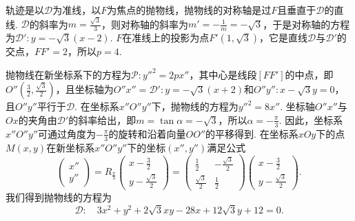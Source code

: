 \begin{solution}
  \begin{inparaenum}[(a)]
    \item 轨迹是以$\mathscr D$为准线，以$F$为焦点的抛物线，抛物线的对称轴是过$F$且垂直于$\mathscr D$的直线. $\mathscr D$的斜率为$m=\frac{\sqrt3}3$，则对称轴的斜率为$m'=-\frac1m=-\sqrt3$，于是对称轴的方程为$\mathscr D':y=-\sqrt3(x-2)$. $F$在准线上的投影为点$F'(1,\sqrt3)$，它是直线$\mathscr D$与$\mathscr D'$的交点，$FF'=2$，所以$p=4$.

        抛物线在新坐标系下的方程为$\mathscr P:y''^2=2px''$，其中心是线段$[FF']$的中点，即$O''\left(\frac32,\frac{\sqrt3}2\right)$，且坐标轴为$O''x''=\mathscr D':y=-\sqrt3(x+2)$和$O''y'':x-\sqrt3y=0$，且$O''y''$平行于$\mathscr D$. 在坐标系$x''O''y''$下，抛物线的方程为$y''^2=8x''$. 坐标轴$O''x''$与$Ox$的夹角由$\mathscr D'$的斜率给出，即$m=\tan\alpha=-\sqrt3$，所以$\alpha=-\frac\pi3$. 因此，坐标系$x''O''y''$可通过角度为$-\frac\pi3$的旋转和沿着向量$OO''$的平移得到. 在坐标系$xOy$下的点$M(x,y)$在新坐标系$x''O''y''$下的坐标$(x'',y'')$满足公式
        \[
          \begin{pmatrix}
            x'' \\
            y''
          \end{pmatrix} = R_{\frac\pi3}
          \begin{pmatrix}
            x - \frac32 \\
            y - \frac{\sqrt3}2
          \end{pmatrix} =
          \begin{pmatrix}
            \frac12 & -\frac{\sqrt3}2 \\
            \frac{\sqrt3}2 & \frac12
          \end{pmatrix}
          \begin{pmatrix}
            x - \frac32 \\
            y - \frac{\sqrt3}2
          \end{pmatrix}.
        \]
    我们得到抛物线的方程为
    \[
      \mathscr D:\quad 3x^2 + y^2 + 2\sqrt3xy - 28x + 12\sqrt3y + 12 = 0.
    \]


\end{inparaenum}
\end{solution}
